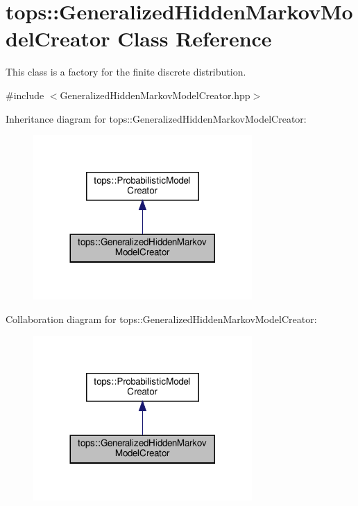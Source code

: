 \hypertarget{classtops_1_1GeneralizedHiddenMarkovModelCreator}{}\section{tops\+:\+:Generalized\+Hidden\+Markov\+Model\+Creator Class Reference}
\label{classtops_1_1GeneralizedHiddenMarkovModelCreator}


This class is a factory for the finite discrete distribution.  




{\ttfamily \#include $<$Generalized\+Hidden\+Markov\+Model\+Creator.\+hpp$>$}



Inheritance diagram for tops\+:\+:Generalized\+Hidden\+Markov\+Model\+Creator\+:
\nopagebreak
\begin{figure}[H]
\begin{center}
\leavevmode
\includegraphics[width=236pt]{classtops_1_1GeneralizedHiddenMarkovModelCreator__inherit__graph}
\end{center}
\end{figure}


Collaboration diagram for tops\+:\+:Generalized\+Hidden\+Markov\+Model\+Creator\+:
\nopagebreak
\begin{figure}[H]
\begin{center}
\leavevmode
\includegraphics[width=236pt]{classtops_1_1GeneralizedHiddenMarkovModelCreator__coll__graph}
\end{center}
\end{figure}
